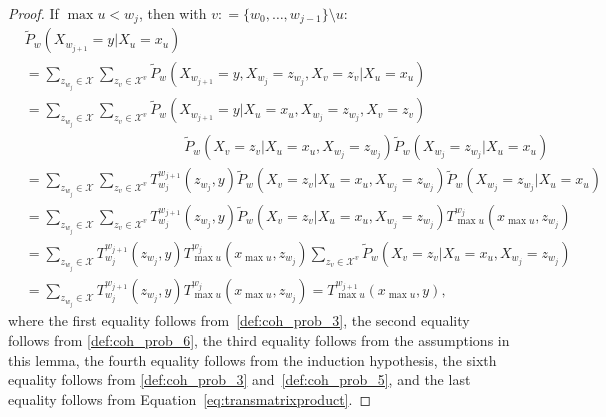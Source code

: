 \documentclass[10pt]{paper}
\theoremstyle{definition}
\newcommand{\states}{\mathcal{X}}
\newcommand{\coloneqq}{:\!=}
\begin{document}
\begin{proof}
If $\max u<w_j$, then with $v\coloneqq\{w_0,\dots,w_{j-1}\}\setminus u$:
\begin{align*}
&\tilde{P}_w(X_{w_{j+1}}=y\vert X_u=x_u)\\[1,5mm]
&=\sum_{z_{w_j}\in\states}
\sum_{z_{v}\in\states^{v}}
\tilde{P}_w(X_{w_{j+1}}=y, X_{w_j}=z_{w_j}, X_v=z_v\vert X_u=x_u)\\
&=\sum_{z_{w_j}\in\states}
\sum_{z_{v}\in\states^{v}}
\tilde{P}_w(X_{w_{j+1}}=y\vert X_u=x_u, X_{w_j}=z_{w_j}, X_v=z_v)\\[-4mm]
&\quad\quad\quad\quad\quad\quad\quad\quad\quad\quad\quad~\,
\tilde{P}_w(X_v=z_v\vert X_u=x_u, X_{w_j}=z_{w_j})
\tilde{P}_w(X_{w_j}=z_{w_j}\vert X_u=x_u)\\[4mm]
&=\sum_{z_{w_j}\in\states}
\sum_{z_{v}\in\states^{v}}
T_{w_j}^{w_{j+1}}(z_{w_j},y)
\tilde{P}_w(X_v=z_v\vert X_u=x_u, X_{w_j}=z_{w_j})
\tilde{P}_w(X_{w_j}=z_{w_j}\vert X_u=x_u)\\
&=\sum_{z_{w_j}\in\states}
\sum_{z_{v}\in\states^{v}}
T_{w_j}^{w_{j+1}}(z_{w_j},y)
\tilde{P}_w(X_v=z_v\vert X_u=x_u, X_{w_j}=z_{w_j})
T_{\max u}^{w_{j}}(x_{\max u},z_{w_j})\\
&=\sum_{z_{w_j}\in\states}
T_{w_j}^{w_{j+1}}(z_{w_j},y)
T_{\max u}^{w_{j}}(x_{\max u},z_{w_j})
\sum_{z_{v}\in\states^{v}}
\tilde{P}_w(X_v=z_v\vert X_u=x_u, X_{w_j}=z_{w_j})
\\
&=\sum_{z_{w_j}\in\states}
T_{w_j}^{w_{j+1}}(z_{w_j},y)
T_{\max u}^{w_{j}}(x_{\max u},z_{w_j})
=T_{\max u}^{w_{j+1}}(x_{\max u},y),
\end{align*}
where the first equality follows from~\ref{def:coh_prob_3}, the second equality follows from \ref{def:coh_prob_6}, the third equality follows from the assumptions in this lemma, the fourth equality follows from the induction hypothesis, the sixth equality follows from \ref{def:coh_prob_3} and~\ref{def:coh_prob_5}, and the last equality follows from Equation~\eqref{eq:transmatrixproduct}.
\end{proof}
\end{document}
